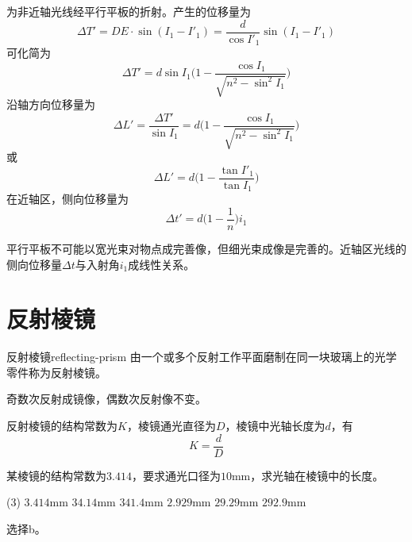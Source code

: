 \documentclass[cn,10pt,chinesefont=founder,math=newtx,cite=super,twoside]{elegantbook}
\begin{document}
 为非近轴光线经平行平板的折射。产生的位移量为
\begin{equation}
\Delta T'=DE\cdot\sin(I_1-I'_1)=\frac{d}{\cos{I'_1}}\sin(I_1-I'_1)
\end{equation}
可化简为
\begin{equation}
\Delta T'=d\sin I_1\bigg(1-\frac{\cos I_1}{\sqrt{n^2-\sin^2 I_1}}\bigg)
\end{equation}
沿轴方向位移量为
\begin{equation}
\Delta L'=\frac{\Delta T'}{\sin I_1}=d\bigg(1-\frac{\cos I_1}{\sqrt{n^2-\sin^2 I_1}}\bigg)
\end{equation}
或
\begin{equation}
\Delta L'=d\bigg(1-\frac{\tan I'_1}{\tan I_1}\bigg)
\end{equation}
在近轴区，侧向位移量为
\begin{equation}
\Delta t'=d\bigg(1-\frac{1}{n}\bigg)i_1
\end{equation}

\begin{note}
	平行平板不可能以宽光束对物点成完善像，但细光束成像是完善的。近轴区光线的侧向位移量$\Delta t$与入射角$i_1$成线性关系。
\end{note}

\section{反射棱镜}
\label{sect:reflecting-prism}

\begin{definition}{反射棱镜}{reflecting-prism}
	由一个或多个反射工作平面磨制在同一块玻璃上的光学零件称为反射棱镜。
\end{definition}

\begin{property}
	奇数次反射成镜像，偶数次反射像不变。
\end{property}

反射棱镜的结构常数为$K$，棱镜通光直径为$D$，棱镜中光轴长度为$d$，有
\begin{equation}
K=\frac{d}{D}
\end{equation}

\begin{problem}
	某棱镜的结构常数为$3.414$，要求通光口径为$10$mm，求光轴在棱镜中的长度。
	\begin{tasks}(3)
		\task $3.414$mm
		\task $34.14$mm
		\task $341.4$mm
		\task $2.929$mm
		\task $29.29$mm
		\task $292.9$mm
	\end{tasks}
\end{problem}
\begin{solution}
	选择b。
\end{solution}
\end{document}
